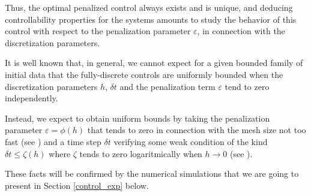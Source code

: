 Thus, the optimal penalized control always exists and is unique, and deducing controllability properties for the systems amounts to study the behavior of this control with respect to the penalization parameter $\varepsilon$, in connection with the discretization parameters.  

It is well known that, in general, we cannot expect for a given bounded family of initial data that the fully-discrete controls are uniformly bounded when the discretization parameters $h$, $\delta t$ and the penalization term $\varepsilon$ tend to zero independently. 

Instead, we expect to obtain uniform bounds by taking the penalization parameter $\varepsilon=\phi(h)$ that tends to zero in connection with the mesh size not too fast (see \cite{boyer2013penalised}) and a time step $\delta t$ verifying some weak condition of the kind $\delta t\leq \zeta(h)$ where $\zeta$ tends to zero logaritmically when $h\to 0$ (see \cite{boyer2011uniform}).

These facts will be confirmed by the numerical simulations that we are going to present in Section \ref{control_exp} below.